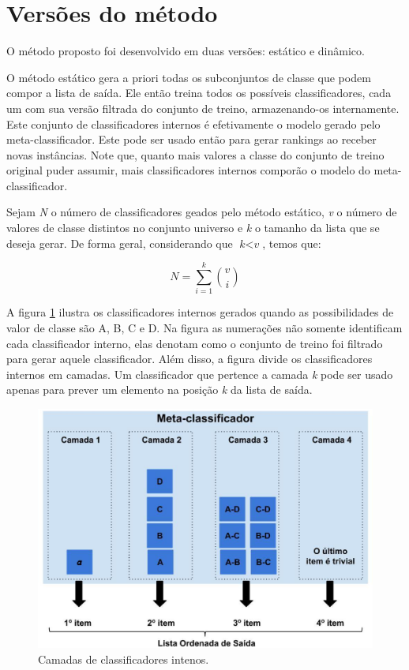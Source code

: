 \section{Versões do método}

O método proposto foi desenvolvido em duas versões: estático e dinâmico.

O método estático gera a priori todas os subconjuntos de classe que podem compor a lista de saída. Ele então treina todos os possíveis classificadores, cada um com sua versão filtrada do conjunto de treino, armazenando-os internamente. Este conjunto de classificadores internos é efetivamente o modelo gerado pelo meta-classificador. Este pode ser usado então para gerar rankings ao receber novas instâncias. Note que, quanto mais valores a classe do conjunto de treino original puder assumir, mais classificadores internos comporão o modelo do meta-classificador.

Sejam \textit{N} o número de classificadores geados pelo método estático, \textit{v} o número de valores de classe distintos no conjunto universo e \textit{k} o tamanho da lista que se deseja gerar. De forma geral, considerando que $\textit{k} < \textit{v}$, temos que:

\begin{equation*}

\textit{N} = \sum\limits_{i=1}^k \binom{v}{i}

\end{equation*}

A figura \ref{fig:metodoproposto03} ilustra os classificadores internos gerados quando as possibilidades de valor de classe são A, B, C e D. Na figura as numerações não somente identificam cada classificador interno, elas denotam como o conjunto de treino foi filtrado para gerar aquele classificador. Além disso, a figura divide os classificadores internos em camadas. Um classificador que pertence a camada \textit{k} pode ser usado apenas para prever um elemento na posição \textit{k} da lista de saída.

\begin{figure}[h!]
  \includegraphics[width=\linewidth]{images/metodoproposto03.eps}
  \caption{Camadas de classificadores intenos.}
  \label{fig:metodoproposto03}
\end{figure}

